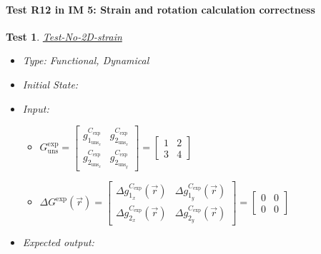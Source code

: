 \documentclass[12pt, titlepage]{article}
\newtheorem{Test}{Test}
\begin{document}
\paragraph{Test R12 in IM 5: Strain and rotation calculation correctness}						

\begin{Test}\normalfont\underline{Test-No-2D-strain}
\label{T_No-2D-strain}
\begin{itemize}
\item Type: Functional, Dynamical
\item Initial State:
\item Input:
\begin{itemize}
	\item $G_{\text{uns}}^{\text{exp}} =
	\begin{bmatrix}
	g_{1_{{\text{uns}}_x}}^{C_{\text{exp}}} & g_{2_{{\text{uns}}_x}}^{C_{\text{exp}}} \\
	g_{2_{{\text{uns}}_x}}^{C_{\text{exp}}} & g_{2_{{\text{uns}}_y}}^{C_{\text{exp}}} 
	\end{bmatrix} =\begin{bmatrix}
	1 & 2 \\
	3 & 4 
	\end{bmatrix} $
	\item $\Delta G^{\text{exp}}(\vec{r})=
	\begin{bmatrix}
	\Delta g_{1_{x}}^{C_{\text{exp}}}(\vec{r}) & \Delta g_{1_{y}}^{C_{\text{exp}}}(\vec{r}) \\
	\Delta g_{2_{x}}^{C_{\text{exp}}}(\vec{r}) & \Delta g_{2_{y}}^{C_{\text{exp}}}(\vec{r})
	\end{bmatrix} = \begin{bmatrix}
	0 & 0 \\
	0 & 0 
	\end{bmatrix} $
	\end{itemize} 
\item Expected output:
\end{itemize}
\end{Test}
\end{document}
